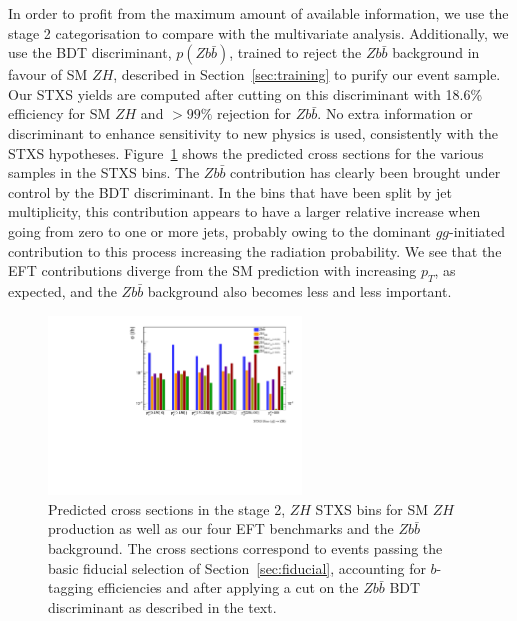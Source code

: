 %
In order to profit from the maximum amount of available information, we use the stage 2 categorisation to compare with the multivariate analysis. Additionally, we use the BDT discriminant, $p(Z b\bar{b})$, trained to reject the $Zb\bar{b}$ background in favour of SM $ZH$, described in Section~\ref{sec:training} to purify our event sample. Our STXS yields are computed after cutting on this discriminant with 18.6\% efficiency for SM $ZH$  and $> 99\%$ rejection for $Zb\bar{b}$. No extra information or discriminant to enhance sensitivity to new physics is used, consistently with the STXS hypotheses.  Figure~\ref{fig:stxs_crosssec} shows the predicted cross sections for the various samples in the STXS bins. The $Zb\bar{b}$ contribution has clearly been brought under control by the BDT discriminant. In the bins that have been split by jet multiplicity, this contribution appears to have a larger relative increase when going from zero to one or more jets, probably owing to the dominant $gg$-initiated contribution to this process increasing the radiation probability. We see that the EFT contributions diverge from the SM prediction with increasing $p_T$, as expected, and the $Zb\bar{b}$ background also becomes less and less important. 

\begin{figure}[h!]
\centering
\includegraphics[width=0.6\textwidth]{plots/STXS_comp.pdf}
\caption{
\label{fig:stxs_crosssec}
Predicted cross sections in the stage 2, $ZH$ STXS bins for SM $ZH$ production as well as our four EFT benchmarks and the $Zb\bar{b}$ background. The cross sections correspond to events passing the basic fiducial selection of Section~\ref{sec:fiducial}, accounting for $b$-tagging efficiencies and after applying a cut on the $Zb\bar{b}$ BDT discriminant as described in the text.
    }
\end{figure}






